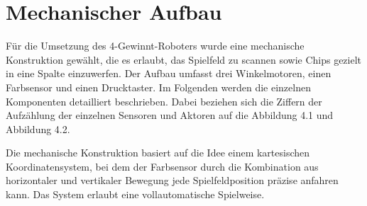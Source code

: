 \chapter{Mechanischer Aufbau}
\label{cha:Mechanischer Aufbau}




Für die Umsetzung des 4-Gewinnt-Roboters wurde eine mechanische Konstruktion gewählt, die es erlaubt, das Spielfeld zu scannen sowie Chips gezielt in eine Spalte einzuwerfen. Der Aufbau umfasst drei Winkelmotoren, einen Farbsensor und einen Drucktaster. Im Folgenden werden die einzelnen Komponenten detailliert beschrieben. Dabei beziehen sich die Ziffern der Aufzählung der einzelnen Sensoren und Aktoren auf die Abbildung 4.1 und Abbildung 4.2.

Die mechanische Konstruktion basiert auf die Idee einem kartesischen Koordinatensystem, bei dem der Farbsensor durch die Kombination aus horizontaler und vertikaler Bewegung jede Spielfeldposition präzise anfahren kann. Das System erlaubt eine vollautomatische Spielweise.

